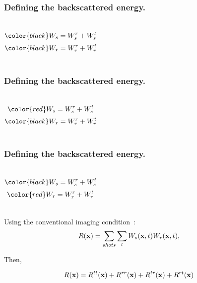 \begin{frame} \frametitle{Defining the backscattered energy.}

\begin{columns}
\vspace{0.2in}
\[
\color{black} \US= \USr + \USt
\]
\vspace{0.3in}
\[
\color{black} \UR= \URr + \URt
\]
\end{columns}

\end{frame}



\begin{frame} \frametitle{Defining the backscattered energy.}

\begin{columns}
\vspace{0.2in}
\[
\color{red} \US= \USr + \USt
\]
\vspace{0.3in}
\[
\color{black} \UR= \URr + \URt
\]
\end{columns}

\end{frame}



\begin{frame} \frametitle{Defining the backscattered energy.}

\begin{columns}
\vspace{0.2in}
\[
\color{black} \US= \USr + \USt
\]
\vspace{0.3in}
\[
\color{red} \UR= \URr + \URt
\]
\end{columns}

\end{frame}














\begin{frame} 
Using the conventional imaging condition~\cite{claerbout:467}:
\[
R({\bf x})= \sum_{shots} \sum_t {W_s}({\bf x},t) {W_r}({\bf x},t),
\]

Then,

\[
R({\bf x}) = R^{tt}({\bf x}) +R^{rr}({\bf x})+ R^{tr}({\bf x})+ R^{rt}({\bf x})
\label{eq:cases}
\]
\cite{liu:S29}
\end{frame}



